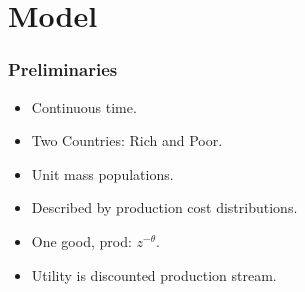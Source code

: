\documentclass{beamer}
\begin{document}
\section{Model}
\begin{frame}
    \frametitle{Preliminaries}
    \begin{itemize}
        \item Continuous time.
        \item Two Countries: Rich and Poor.
        \item Unit mass populations.
        \item Described by production cost distributions.
        \item One good, prod: $z^{-\theta}$.
        \item Utility is discounted production stream.
    \end{itemize}
\end{frame}
\end{document}
